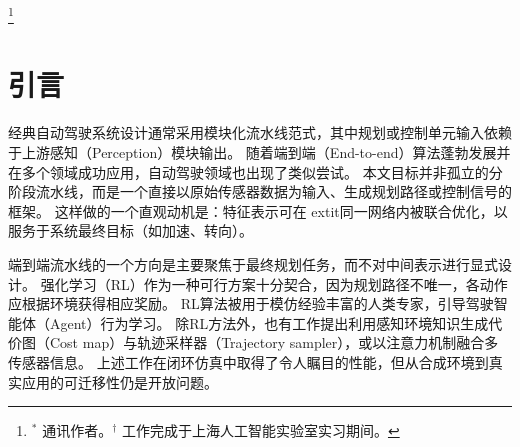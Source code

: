\documentclass[runningheads]{llncs}
\begin{document}
\let\thefootnote\relax\footnote{$^\ast$ 通讯作者。$^\dagger$ 工作完成于上海人工智能实验室实习期间。}

\begin{abstract}
现有自动驾驶范式大多采用多阶段离散任务流水线。为更好预测控制信号并提升用户安全性，一种能从联合时空特征学习中受益的端到端（End-to-end）方法十分必要。尽管已有一些基于 LiDAR（LiDAR）输入或隐式设计的先驱工作，本文在一个可解释的视觉设置下对问题进行建模。具体而言，提出一种时空（Spatial-temporal）特征学习方案，为感知（Perception）、预测（Prediction）和规划（Planning）任务同时学习更具代表性的特征，称为 ST-P3（ST-P3）。其中，提出一种自我中心对齐累积（Egocentric Aligned Accumulation）技术，在鸟瞰图（Bird's eye view, BEV）变换前保留 3D 空间几何信息；设计一种双路径建模（Dual Pathway Modelling）方法，将过去运动变化纳入未来预测；引入一个基于时序的优化单元，补偿规划中对视觉元素的识别。据本文所知，首次系统性地研究了可解释端到端视觉自动驾驶系统的各个部分。在开环（Open-loop）nuScenes（nuScenes）数据集和闭环（Closed-loop）CARLA（CARLA）仿真上对方法进行了基准测试，与最先进方法（State-of-the-art, SOTA）对比。结果表明了本文方法的有效性。源代码、模型和协议细节已在 \url{https://github.com/OpenPerceptionX/ST-P3} 公开。

\end{abstract}


\section{引言}\label{sec: intro}




经典自动驾驶系统设计通常采用模块化流水线范式\cite{behere2015functional,yurtsever2020survey}，其中规划或控制单元输入依赖于上游感知（Perception）模块输出。
%
随着端到端（End-to-end）算法蓬勃发展并在多个领域成功应用\cite{pfeiffer2017perception,hamalainen2019affordance}，自动驾驶领域也出现了类似尝试\cite{pomerleau1988alvinn,bojarski2016end,openpilot,bansal2018chauffeurnet,chitta2021neat,prakash2021multi,zhang2021end,chen2021wor,chen2022lav}。
%
本文目标并非孤立的分阶段流水线，而是一个直接以原始传感器数据为输入、生成规划路径或控制信号的框架。
%
这样做的一个直观动机是：特征表示可在	extit{同一}网络内被联合优化，以服务于系统最终目标（如加速、转向）。
%

端到端流水线的一个方向是主要聚焦于最终规划任务，而不对中间表示进行显式设计\cite{codevilla2018end,codevilla2019exploring,prakash2021multi,chen2020learning,chitta2021neat,hu2021safe}。
%
强化学习（RL）作为一种可行方案十分契合，因为规划路径不唯一，各动作应根据环境获得相应奖励。
%
RL算法被用于模仿经验丰富的人类专家，引导驾驶智能体（Agent）行为学习\cite{zhang2021end,Chekroun2021gri}。
除RL方法外，也有工作提出利用感知环境知识生成代价图（Cost map）与轨迹采样器（Trajectory sampler）\cite{hu2021safe,chitta2021neat}，或以注意力机制融合多传感器信息\cite{prakash2021multi,fadadu2022multi}。
%
上述工作在闭环仿真中取得了令人瞩目的性能\cite{dosovitskiy2017carla}，但从合成环境到真实应用的可迁移性仍是开放问题。
\end{document}
